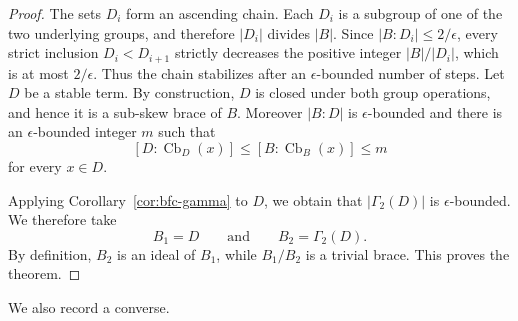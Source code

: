 \documentclass[11pt, oneside]{amsart}
\numberwithin{equation}{section}
\theoremstyle{plain}
\theoremstyle{definition}
\newcommand{\Cb}{\operatorname{Cb} }
\begin{document}
\begin{proof}
The sets $D_i$ form an ascending chain. Each $D_i$ is a subgroup of one of the two underlying groups, and therefore $|D_i|$ divides $|B|$. Since $|B:D_i|\leqslant2/\epsilon$, every strict inclusion $D_i<D_{i+1}$ strictly decreases the positive integer $|B|/|D_i|$, which is at most $2/\epsilon$. Thus the chain stabilizes after an $\epsilon$-bounded number of steps. Let $D$ be a stable term. By construction, $D$ is closed under both group operations, and hence it is a sub-skew brace of $B$. Moreover $|B:D|$ is $\epsilon$-bounded and there is an $\epsilon$-bounded integer $m$ such that
$$
[D:\Cb_D(x)]\leqslant[B:\Cb_B(x)]\leqslant m
$$
for every $x\in D$.

Applying Corollary~\ref{cor:bfc-gamma} to $D$, we obtain that $|\Gamma_2(D)|$ is $\epsilon$-bounded. We therefore take
$$
B_1=D\qquad\text{and}\qquad B_2=\Gamma_2(D).
$$
By definition, $B_2$ is an ideal of $B_1$, while $B_1/B_2$ is a trivial brace. This proves the theorem.
\end{proof}


We also record a converse.
\end{document}
